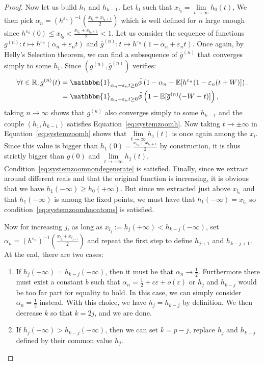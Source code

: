\documentclass[11pt]{article}
\newcommand{\eps}{\varepsilon}
\begin{document}
\begin{proof}
    Now let us build $h_{1}$ and $h_{{k-1}}$.
    Let $l_0$ such that $x_{l_0}= \underset{t \rightarrow \infty}{\lim}h_0(t)$, We then pick $\alpha_n=(h^{\eps_n})^{-1}(\frac{x_{l_0}+x_{l_0+1}}{2})$ which is well defined for $n$ large enough since $h^{\eps_n}(0) \leq  x_{l_0} < \frac{x_{l_0}+x_{l_0+1}}{2} < 1$.
    Let us consider the sequence of functions $\underline{g}^{(n)}: t\mapsto  h^{\eps_n}(\alpha_n + \eps_n t)$ and $\overline{g}^{(n)}: t \mapsto h^{\eps_n}(1-\alpha_n+\eps_n t)$.
    Once again, by Helly's Selection theorem,  we can find a subsequence of $\overline{g}^{(n)}$ that converges simply to some $h_{1}$. Since $(\underline{g}^{(n)},\overline{g}^{(n)})$ verifies:
    \begin{align*}
        \forall t \in \mathbb{R},  \underline{g}^{(n)}(t) &= \mathbbm{1}_{\alpha_n+\eps_n t \geq 0} \hat{\phi} \left( 1-\alpha_n- \mathbb{E}[h^{\eps_n}(1-\eps_n(t+W)]\right). \\
        &= \mathbbm{1}_{\alpha_n+\eps_n t \geq 0} \hat{\phi}\left( 1- \mathbb{E} [\overline{g}^{(n)}(-W-t)] \right),
    \end{align*}
    taking $n \rightarrow \infty$ shows that $\underline{g}^{(n)}$ also converges simply to some $h_{k-1}$ and the couple $(h_{1},h_{k-1})$ satisfies Equation~\eqref{eq:systemzoomh}.
    Now taking $t \rightarrow \pm \infty$ in Equation~\eqref{eq:systemzoomh} shows that $\underset{t \rightarrow \infty}{\lim}h_{1}(t)$ is once again among the $x_l$. Since this value is bigger than $h_{1}(0)=\frac{x_{l_0}+x_{l_0+1}}{2}$ by construction, it is thus strictly bigger than $g(0)$ and $\underset{t \rightarrow -\infty}{\lim}h_{1}(t)$. Condition~\eqref{eq:systemzoomnondegenerate} is satisfied.
    Finally, since we extract around different reals and that the original function is increasing, it is obvious that we have $h_1(-\infty) \geq h_{0}(+\infty)$. But since we extracted just above $x_{l_0}$ and that $h_1(-\infty)$ is among the fixed points, we must have that $h_1(-\infty)=x_{l_0}$ so condition~\ref{eq:systemzoomhnoatoms} is satisfied.
    
    Now for increasing $j$, as long as $x_{l_j}:=h_j(+\infty) < h_{k-j}(-\infty)$, set $\alpha_n=(h^{\eps_n})^{-1}\left(\frac{x_{l_j}+x_{l_{j+1}}}{2}\right)$ and repeat the first step to define $h_{j+1}$ and $h_{k-j+1}$.
    At the end, there are two cases:
    \begin{enumerate}
    \item If $h_j(+\infty) = h_{k-{j}}(-\infty)$, then it must be that $\alpha_n \rightarrow \frac{1}{2}$. Furthermore there must exist a constant $b$ such that $\alpha_n=\frac{1}{2}+c \eps + o(\eps)$ or $h_j$ and $h_{k-j}$ would be too far part for equality to hold. In this case, we can simply consider $\alpha_n=\frac{1}{2}$ instead. With this choice, we have $h_j=h_{k-j}$ by definition. We then decrease $k$ so that $k=2j$, and we are done.
    \item If $h_j(+\infty) > h_{k-j}(-\infty)$, then we can set $k=p-j$, replace $h_j$ and $h_{k-j}$ defined by their common value $h_{j}$.
    \end{enumerate}
\end{proof}
\end{document}
